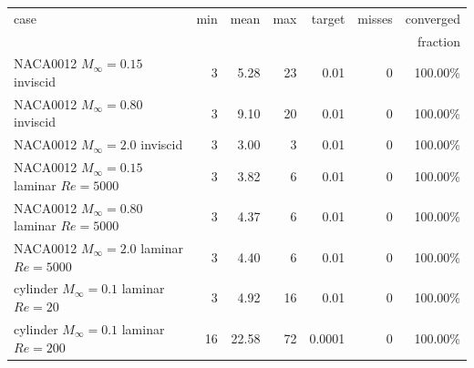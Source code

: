 \footnotesize
\begin{tabular}{lrrrrrr}
\toprule
case & min & mean & max & target & misses & converged\\
 & & & & & & fraction\\
\midrule
NACA0012 $M_\infty=0.15$ inviscid & 3 & 5.28 & 23 & 0.01 & 0 & 100.00\%\\
NACA0012 $M_\infty=0.80$ inviscid & 3 & 9.10 & 20 & 0.01 & 0 & 100.00\%\\
NACA0012 $M_\infty=2.0$ inviscid & 3 & 3.00 & 3 & 0.01 & 0 & 100.00\%\\
NACA0012 $M_\infty=0.15$ laminar $Re=5000$ & 3 & 3.82 & 6 & 0.01 & 0 & 100.00\%\\
NACA0012 $M_\infty=0.80$ laminar $Re=5000$ & 3 & 4.37 & 6 & 0.01 & 0 & 100.00\%\\
NACA0012 $M_\infty=2.0$ laminar $Re=5000$ & 3 & 4.40 & 6 & 0.01 & 0 & 100.00\%\\
cylinder $M_\infty=0.1$ laminar $Re=20$ & 3 & 4.92 & 16 & 0.01 & 0 & 100.00\%\\
cylinder $M_\infty=0.1$ laminar $Re=200$ & 16 & 22.58 & 72 & 0.0001 & 0 & 100.00\%\\
\bottomrule
\end{tabular}
